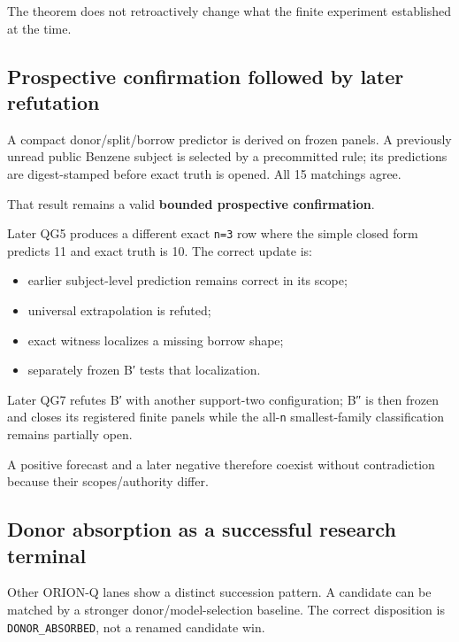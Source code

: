 \documentclass[preprint,12pt]{elsarticle}
\providecommand{\tightlist}{%
  \setlength{\itemsep}{0pt}\setlength{\parskip}{0pt}}
\begin{document}
The theorem does not retroactively change what the finite experiment
established at the time.

\hypertarget{prospective-confirmation-followed-by-later-refutation}{%
\subsection{Prospective confirmation followed by later
refutation}\label{prospective-confirmation-followed-by-later-refutation}}

A compact donor/split/borrow predictor is derived on frozen panels. A
previously unread public Benzene subject is selected by a precommitted
rule; its predictions are digest-stamped before exact truth is opened.
All 15 matchings agree.

That result remains a valid \textbf{bounded prospective confirmation}.

Later QG5 produces a different exact \texttt{n=3} row where the simple
closed form predicts 11 and exact truth is 10. The correct update is:

\begin{itemize}
\tightlist
\item
  earlier subject-level prediction remains correct in its scope;
\item
  universal extrapolation is refuted;
\item
  exact witness localizes a missing borrow shape;
\item
  separately frozen B′ tests that localization.
\end{itemize}

Later QG7 refutes B′ with another support-two configuration; B″ is then
frozen and closes its registered finite panels while the all-\texttt{n}
smallest-family classification remains partially open.

A positive forecast and a later negative therefore coexist without
contradiction because their scopes/authority differ.

\hypertarget{donor-absorption-as-a-successful-research-terminal}{%
\subsection{Donor absorption as a successful research
terminal}\label{donor-absorption-as-a-successful-research-terminal}}

Other ORION-Q lanes show a distinct succession pattern. A candidate can
be matched by a stronger donor/model-selection baseline. The correct
disposition is \texttt{DONOR\_ABSORBED}, not a renamed candidate win.
\end{document}
